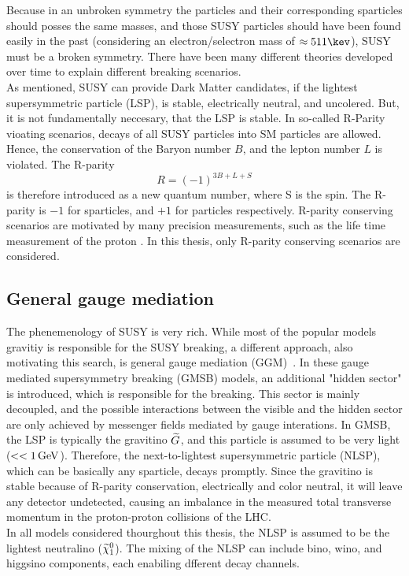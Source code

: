 Because in an unbroken symmetry the particles and their corresponding sparticles should posses the same masses, and those SUSY particles should have been found easily in the past (considering \eg an electron/selectron mass of $\approx511\kev$), SUSY must be a broken symmetry. There have been many different theories developed over time to explain different breaking scenarios.\\
As mentioned, SUSY can provide Dark Matter candidates, if the lightest supersymmetric particle (LSP), is stable, electrically neutral, and uncolered. But, it is not fundamentally neccesary, that the LSP is stable. In so-called R-Parity vioating scenarios, decays of all SUSY particles into SM particles are allowed. Hence, the conservation of the Baryon number $B$, and the lepton number $L$ is violated. The R-parity
\begin{equation}
 R = (-1)^{3B+L+S}
\end{equation}
is therefore introduced as a new quantum number, where S is the spin. The R-parity is $-1$ for sparticles, and $+1$ for particles respectively. R-parity conserving scenarios are motivated by many precision measurements, such as the life time measurement of the proton .
In this thesis, only R-parity conserving scenarios are considered.\\



\subsection{General gauge mediation}\label{sec:GGM}
The phenemenology of SUSY is very rich. While most of the popular models gravitiy is responsible for the SUSY breaking, a different approach, also motivating this search, is general gauge mediation (GGM)~\cite{GGM}. In these gauge mediated supersymmetry breaking (GMSB) models, an additional "hidden sector" is introduced, which is responsible for the breaking. This sector is mainly decoupled, and the possible interactions between the visible and the hidden sector are only achieved by messenger fields mediated by gauge interations. In GMSB, the LSP is typically the gravitino $\widetilde{G}$, and this particle is assumed to be very light ($<<1\,\text{Ge\hspace{-.08em}V}$). Therefore, the next-to-lightest supersymmetric particle (NLSP), which can be basically any sparticle, decays promptly. Since the gravitino is stable because of R-parity conservation, electrically and color neutral, it will leave any detector undetected, causing an imbalance in the measured total transverse momentum in \eg the proton-proton collisions of the LHC.\\
In all models considered thourghout this thesis, the NLSP is assumed to be the lightest neutralino ($\widetilde{\chi}^{0}_{1}$). The mixing of the NLSP can include bino, wino, and higgsino components, each enabiling dfferent decay channels.



